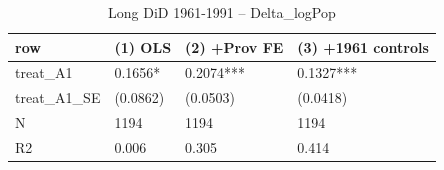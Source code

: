 \begin{table}

\caption{Long DiD 1961-1991 -- Delta_logPop}
\centering
\begin{tabular}[t]{llll}
\toprule
row & (1) OLS & (2) +Prov FE & (3) +1961 controls\\
\midrule
treat\_A1 & 0.1656* & 0.2074*** & 0.1327***\\
treat\_A1\_SE & (0.0862) & (0.0503) & (0.0418)\\
N & 1194 & 1194 & 1194\\
R2 & 0.006 & 0.305 & 0.414\\
\bottomrule
\end{tabular}
\end{table}
